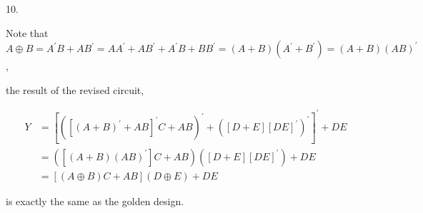 \documentclass[UTF8,12pt,letterpaper,oneside]{amsart}
\begin{document}
10.

Note that
$A \oplus B = A^\prime B + AB^\prime = AA^\prime + AB^\prime + A^\prime B + BB^\prime = (A + B)(A^\prime + B^\prime) = (A + B)(AB)^\prime$,


the result of the revised circuit,

\begin{equation*}\begin{split}
Y &= [([(A + B)^\prime + AB]^\prime C + AB)^\prime + ([D + E][DE]^\prime)^\prime]^\prime + DE\\
  &= ([(A + B)(AB)^\prime] C + AB)([D + E][DE]^\prime) + DE\\
  &= [(A \oplus B)C + AB](D \oplus E) + DE
\end{split}\end{equation*}

is exactly the same as the golden design.
\end{document}
